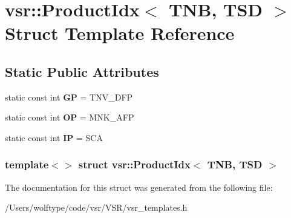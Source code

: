 \hypertarget{structvsr_1_1_product_idx_3_01_t_n_b_00_01_t_s_d_01_4}{\section{vsr\-:\-:Product\-Idx$<$ T\-N\-B, T\-S\-D $>$ Struct Template Reference}
\label{structvsr_1_1_product_idx_3_01_t_n_b_00_01_t_s_d_01_4}
}
\subsection*{Static Public Attributes}
\begin{DoxyCompactItemize}
\item 
\hypertarget{structvsr_1_1_product_idx_3_01_t_n_b_00_01_t_s_d_01_4_a4bc58d3b00f7b63e32450428ad652c6c}{static const int {\bfseries G\-P} = T\-N\-V\-\_\-\-D\-F\-P}\label{structvsr_1_1_product_idx_3_01_t_n_b_00_01_t_s_d_01_4_a4bc58d3b00f7b63e32450428ad652c6c}

\item 
\hypertarget{structvsr_1_1_product_idx_3_01_t_n_b_00_01_t_s_d_01_4_a7e230c1036f266b90264ece80cae37de}{static const int {\bfseries O\-P} = M\-N\-K\-\_\-\-A\-F\-P}\label{structvsr_1_1_product_idx_3_01_t_n_b_00_01_t_s_d_01_4_a7e230c1036f266b90264ece80cae37de}

\item 
\hypertarget{structvsr_1_1_product_idx_3_01_t_n_b_00_01_t_s_d_01_4_a18abdb43085e3559f2e6e0d7a2e4d287}{static const int {\bfseries I\-P} = S\-C\-A}\label{structvsr_1_1_product_idx_3_01_t_n_b_00_01_t_s_d_01_4_a18abdb43085e3559f2e6e0d7a2e4d287}

\end{DoxyCompactItemize}
\subsubsection*{template$<$$>$ struct vsr\-::\-Product\-Idx$<$ T\-N\-B, T\-S\-D $>$}



The documentation for this struct was generated from the following file\-:\begin{DoxyCompactItemize}
\item 
/\-Users/wolftype/code/vsr/\-V\-S\-R/vsr\-\_\-templates.\-h\end{DoxyCompactItemize}
